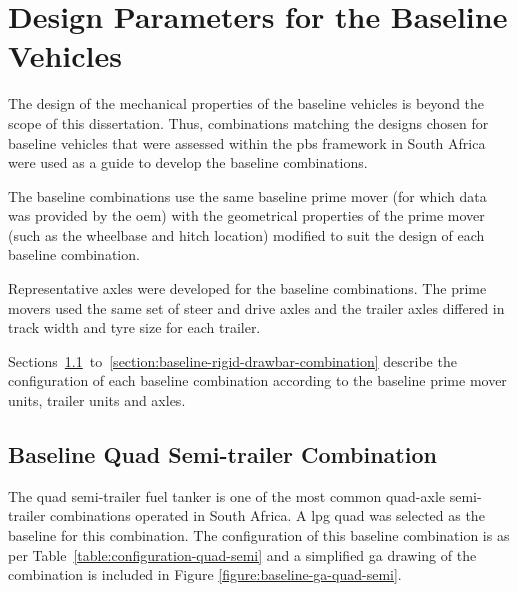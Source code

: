 \section{Design Parameters for the Baseline Vehicles}\label{section:baseline-vehicles-design-parameters}

The design of the mechanical properties of the baseline vehicles is beyond the scope of this dissertation. Thus, combinations matching the designs chosen for baseline vehicles that were assessed within the \gls{pbs} framework in South Africa were used as a guide to develop the baseline combinations.

The baseline combinations use the same baseline prime mover (for which data was provided by the \gls{oem}) with the geometrical properties of the prime mover (such as the wheelbase and hitch location) modified to suit the design of each baseline combination.

Representative axles were developed for the baseline combinations. The prime movers used the same set of steer and drive axles and the trailer axles differed in track width and tyre size for each trailer.

Sections~\ref{section:baseline-quad-semi}~to~\ref{section:baseline-rigid-drawbar-combination} describe the configuration of each baseline combination according to the baseline prime mover units, trailer units and axles.

\subsection{Baseline Quad Semi-trailer Combination}\label{section:baseline-quad-semi}

The quad semi-trailer fuel tanker is one of the most common quad-axle semi-trailer combinations operated in South Africa. A \gls{lpg} quad was selected as the baseline for this combination. The configuration of this baseline combination is as per Table~\ref{table:configuration-quad-semi} and a simplified \gls{ga} drawing of the combination is included in Figure \ref{figure:baseline-ga-quad-semi}.

